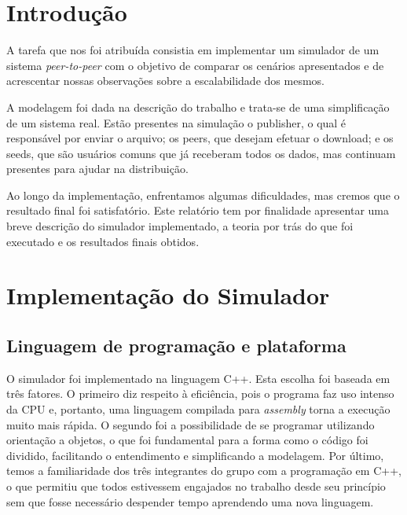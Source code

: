 \documentclass[a4paper,10pt]{article}
\begin{document}
\pagebreak

\tableofcontents
\pagebreak

\listoffigures
\pagebreak

\listoftables
\pagebreak

\section{Introdução}

A tarefa que nos foi atribuída consistia em implementar um simulador de um sistema \textit{peer-to-peer} com o objetivo de comparar os cenários apresentados e de acrescentar nossas observações sobre a escalabilidade dos mesmos.

A modelagem foi dada na descrição do trabalho e trata-se de uma simplificação de um sistema real. Estão presentes na simulação o publisher, o qual é responsável por enviar o arquivo; os peers, que desejam efetuar o download; e os seeds, que são usuários comuns que já receberam todos os dados, mas continuam presentes para ajudar na distribuição. 

Ao longo da implementação, enfrentamos algumas dificuldades, mas cremos que o resultado final foi satisfatório. Este relatório tem por finalidade apresentar uma breve descrição do simulador implementado, a teoria por trás do que foi executado e os resultados finais obtidos.

\pagebreak

\section{Implementação do Simulador}

\subsection{Linguagem de programação e plataforma}

O simulador foi implementado na linguagem C++. Esta escolha foi baseada em três fatores. O primeiro diz respeito à eficiência, pois o programa faz uso intenso da CPU e, portanto, uma linguagem compilada para \textit{assembly} torna a execução muito mais rápida. O segundo foi a possibilidade de se programar utilizando orientação a objetos, o que foi fundamental para a forma como o código foi dividido, facilitando o entendimento e simplificando a modelagem. Por último, temos a familiaridade dos três integrantes do grupo com a programação em C++, o que permitiu que todos estivessem engajados no trabalho desde seu princípio sem que fosse necessário despender tempo aprendendo uma nova linguagem.
\end{document}
